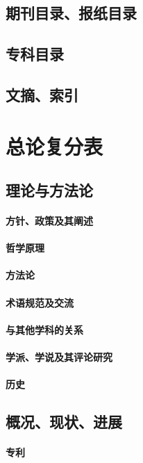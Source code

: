 \documentclass[UTF8]{../ApplicationUniverse}
\begin{document}
\section{期刊目录、报纸目录}
\section{专科目录}
\section{文摘、索引}





\chapter{总论复分表}
\section{理论与方法论}
    \subsubsection{方针、政策及其阐述}
    \subsubsection{哲学原理}
    \subsubsection{方法论}
    \subsubsection{术语规范及交流}
    \subsubsection{与其他学科的关系}
    \subsubsection{学派、学说及其评论研究}
    \subsubsection{历史}
\section{概况、现状、进展}
    \subsubsection{专利}
\end{document}
